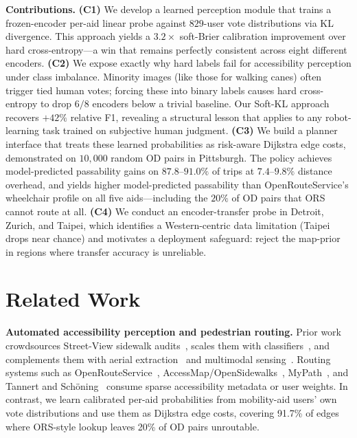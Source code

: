 \documentclass{article}
\begin{document}
\textbf{Contributions.}
\textbf{(C1)} We develop a learned perception module that trains a frozen-encoder per-aid linear probe against $829$-user vote distributions via KL divergence. This approach yields a $\mathbf{3.2\times}$ soft-Brier calibration improvement over hard cross-entropy---a win that remains perfectly consistent across eight different encoders.
\textbf{(C2)} We expose exactly why hard labels fail for accessibility perception under class imbalance. Minority images (like those for walking canes) often trigger tied human votes; forcing these into binary labels causes hard cross-entropy to drop $6/8$ encoders below a trivial baseline. Our Soft-KL approach recovers $+42\%$ relative F1, revealing a structural lesson that applies to any robot-learning task trained on subjective human judgment.
\textbf{(C3)} We build a planner interface that treats these learned probabilities as risk-aware Dijkstra edge costs, demonstrated on $10{,}000$ random OD pairs in Pittsburgh. The policy achieves model-predicted passability gains on $87.8$--$91.0\%$ of trips at $7.4$--$9.8\%$ distance overhead, and yields higher model-predicted passability than OpenRouteService's wheelchair profile on all five aids---including the $20\%$ of OD pairs that ORS cannot route at all.
\textbf{(C4)} We conduct an encoder-transfer probe in Detroit, Zurich, and Taipei, which identifies a Western-centric data limitation (Taipei drops near chance) and motivates a deployment safeguard: reject the map-prior in regions where transfer accuracy is unreliable.



\section{Related Work}
\label{sec:related}

\textbf{Automated accessibility perception and pedestrian routing.} Prior work crowdsources Street-View sidewalk audits~\citep{10.1145/2470654.2470744,10.1145/2642918.2647403,10.1145/3308561.3353798,Saha_ProjectSidewalk_CHI2019}, scales them with classifiers~\citep{o'meara2025rampnet,10.1145/3663548.3688531}, and complements them with aerial extraction~\citep{hosseini2023tile2net,hosseini2022citysurfaces} and multimodal sensing~\citep{damaceno2024sideseeing,10.1145/3441852.3476560}. Routing systems such as OpenRouteService~\citep{openrouteservice2026wheelchair}, AccessMap/OpenSidewalks~\citep{bolten2017accessmap,bolten2019opensidewalks}, MyPath~\citep{saha2022mypath}, and Tannert and Sch{\"o}ning~\citep{tannert2018wheelchair} consume sparse accessibility metadata or user weights. In contrast, we learn calibrated per-aid probabilities from mobility-aid users' own vote distributions and use them as Dijkstra edge costs, covering 91.7\% of edges where ORS-style lookup leaves 20\% of OD pairs unroutable.
\end{document}
